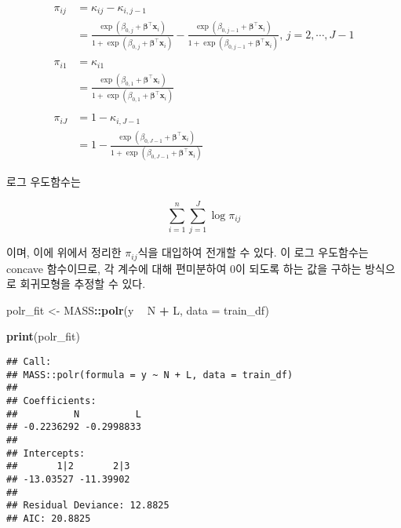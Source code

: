 \documentclass[]{book}
\newenvironment{Shaded}{\begin{snugshade}}{\end{snugshade}}
\newcommand{\DataTypeTok}[1]{\textcolor[rgb]{0.13,0.29,0.53}{#1}}
\newcommand{\KeywordTok}[1]{\textcolor[rgb]{0.13,0.29,0.53}{\textbf{#1}}}
\newcommand{\NormalTok}[1]{#1}
\newcommand{\OperatorTok}[1]{\textcolor[rgb]{0.81,0.36,0.00}{\textbf{#1}}}
\newcommand{\StringTok}[1]{\textcolor[rgb]{0.31,0.60,0.02}{#1}}
\begin{document}
\begin{equation*}
\begin{split}
\pi_{ij} &= \kappa_{ij} - \kappa_{i,j-1}\\
&= \frac{\exp (\beta_{0,j} + \boldsymbol\beta^\top \mathbf{x}_i)}{1 + \exp (\beta_{0,j} + \boldsymbol\beta^\top \mathbf{x}_i)} - \frac{\exp (\beta_{0,j-1} + \boldsymbol\beta^\top \mathbf{x}_i)}{1 + \exp (\beta_{0,j-1} + \boldsymbol\beta^\top \mathbf{x}_i)}, \, j = 2, \cdots, J - 1\\
& \\
\pi_{i1} &= \kappa_{i1}\\
&= \frac{\exp (\beta_{0,1} + \boldsymbol\beta^\top \mathbf{x}_i)}{1 + \exp (\beta_{0,1} + \boldsymbol\beta^\top \mathbf{x}_i)}\\
& \\
\pi_{iJ} &= 1 - \kappa_{i,J-1}\\
&= 1 - \frac{\exp (\beta_{0,J-1} + \boldsymbol\beta^\top \mathbf{x}_i)}{1 + \exp (\beta_{0,J-1} + \boldsymbol\beta^\top \mathbf{x}_i)}
\end{split}
\label{eq:cumulative-logit-prob}
\end{equation*}

로그 우도함수는

\begin{equation*}
\sum_{i = 1}^{n} \sum_{j = 1}^{J} \log \pi_{ij}
\end{equation*}

이며, 이에 위에서 정리한 \(\pi_{ij}\)식을 대입하여 전개할 수 있다. 이 로그 우도함수는 concave 함수이므로\citep{pratt1981concavity}, 각 계수에 대해 편미분하여 0이 되도록 하는 값을 구하는 방식으로 회귀모형을 추정할 수 있다.

\begin{Shaded}
\begin{Highlighting}[]
\NormalTok{polr_fit <-}\StringTok{ }\NormalTok{MASS}\OperatorTok{::}\KeywordTok{polr}\NormalTok{(y }\OperatorTok{~}\StringTok{ }\NormalTok{N }\OperatorTok{+}\StringTok{ }\NormalTok{L, }\DataTypeTok{data =}\NormalTok{ train_df)}

\KeywordTok{print}\NormalTok{(polr_fit)}
\end{Highlighting}
\end{Shaded}

\begin{verbatim}
## Call:
## MASS::polr(formula = y ~ N + L, data = train_df)
## 
## Coefficients:
##          N          L 
## -0.2236292 -0.2998833 
## 
## Intercepts:
##       1|2       2|3 
## -13.03527 -11.39902 
## 
## Residual Deviance: 12.8825 
## AIC: 20.8825
\end{verbatim}
\end{document}
